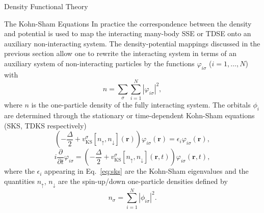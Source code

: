 \documentclass[letterpaper, 11 pt]{report}
\begin{document}
\begin{chapter}{Density Functional Theory \label{chap:dft}}
\begin{section}{The Kohn-Sham Equations \label{sec:ks}}
      In practice the correspondence between the density and potential is used to map the interacting
      many-body SSE or TDSE onto an auxiliary non-interacting system. The density-potential mappings
      discussed in the previous section allow one to rewrite the interacting system in terms of
      an auxiliary system of non-interacting particles by the functions $\varphi_{i\sigma}$ ($i = 1,
      \dots, N$) with
      \begin{equation} \label{eq:dendef2}
         n = \sum\limits_{\sigma} \sum\limits_{i = 1}^N
                           \left| \varphi_{i\sigma} \right|^2,
      \end{equation}
      where $n$ is the one-particle density of the fully interacting system. The orbitals $\phi_i$ are
      determined through the stationary or time-dependent Kohn-Sham equations~\cite{ks-eq, spin-dep1,
      spin-dep3} (SKS, TDKS respectively)
      \begin{equation} \label{eq:sks}
         \left( -\frac{\Delta}{2} + v^\sigma_\mathrm{KS}[n_\uparrow, n_\downarrow](\mathbf{r}) \right)
          \varphi_{i\sigma}(\mathbf{r}) = \epsilon_i \varphi_{i \sigma}(\mathbf{r}),
      \end{equation}
      \begin{equation} \label{eq:tdks}
         i \frac{\partial}{\partial t} \varphi_{i\sigma} = 
            \left( -\frac{\Delta}{2} + v^\sigma_\mathrm{KS}[n_\uparrow, n_\downarrow](\mathbf{r},t)
            \right) \varphi_{i\sigma}(\mathbf{r},t),
      \end{equation}
      where the $\epsilon_i$ appearing in Eq.~\eqref{eq:sks} are the Kohn-Sham eigenvalues and the
      quantities $n_\uparrow$, $n_\downarrow$ are the spin-up/down one-particle densities defined by
      \begin{equation} \label{eq:spinden}
         n_\sigma = \sum\limits_{i=1}^{N} \left| \phi_{i\sigma} \right|^2.
      \end{equation}


\end{section}
\end{chapter}
\end{document}
